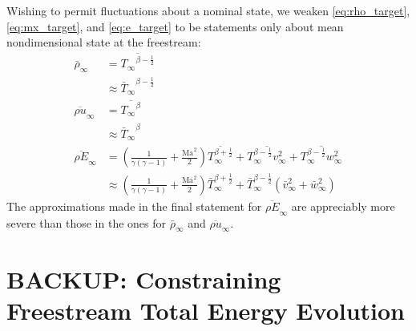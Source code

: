 \documentclass[letterpaper,11pt,nointlimits,reqno]{amsart}
\newcommand{\Mach}[1][]{\ensuremath{\mbox{Ma}_{#1}}}
\begin{document}
Wishing to permit fluctuations about a nominal state, we weaken
\eqref{eq:rho_target}, \eqref{eq:mx_target}, and \eqref{eq:e_target} to be
statements only about mean nondimensional state at the freestream:
\begin{align}
   \bar{\rho}_\infty &= \overline{{T_\infty}^{\beta-\frac{1}{2}}}
\\
                     &\approx {\bar{T}_\infty}^{\beta-\frac{1}{2}}
\\
  \overline{\rho u}_\infty &= \overline{{T_\infty}^\beta}
\\
                           &\approx {\bar{T}_\infty}^\beta
\\
  \overline{\rho E}_\infty
         &= \left(  \frac{1}{\gamma\left(\gamma-1\right)}
                  + \frac{\Mach^2}{2} \right)
            \overline{T_\infty^{\beta+\frac{1}{2}}}
          + \overline{T_\infty^{\beta-\frac{1}{2}} v_\infty^2}
          + \overline{T_\infty^{\beta-\frac{1}{2}} w_\infty^2}
\\
         &\approx \left(  \frac{1}{\gamma\left(\gamma-1\right)}
                        + \frac{\Mach^2}{2} \right)
            \bar{T}_\infty^{\beta+\frac{1}{2}}
          + \bar{T}_\infty^{\beta-\frac{1}{2}}
            \left(\bar{v}_\infty^2 + \bar{w}_\infty^2\right)
\end{align}
The approximations made in the final statement for $\overline{\rho E}_\infty$
are appreciably more severe than those in the ones for $\bar{\rho}_\infty$ and
$\overline{\rho u}_\infty$.

\section{BACKUP: Constraining Freestream Total Energy Evolution}

\end{document}
